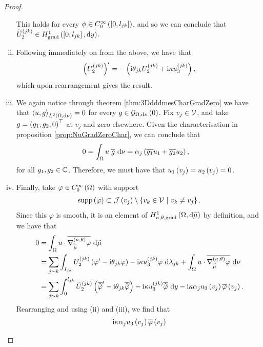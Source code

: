 \begin{proof}
\begin{enumerate}[(i)]
		This holds for every $\phi\in C^{\infty}_{0}\left( \left[ 0,l_{jk} \right] \right)$, and so we can conclude that $\widetilde{U}_2^{(jk)}\in H^1_\mathrm{grad}\left( \left[ 0,l_{jk} \right], \mathrm{d}y \right)$.
		\item Following immediately on from the above, we have that
		\begin{align*}
			\left( U_2^{(jk)} \right)' = - \left(  \mathrm{i}\theta_{jk}U_2^{(jk)} + \mathrm{i}\kappa u_3^{(jk)}  \right),
		\end{align*}
		which upon rearrangement gives the result.
		\item We again notice through theorem \ref{thm:3DdddmesCharGradZero} we have that $\left\langle u , g \right\rangle_{L^{2}\left( \Omega,\mathrm{d} \nu \right)}=0$ for every $g\in\mathcal{G}_{ \Omega, \mathrm{d}\nu}\left( 0 \right)$.
		Fix $v_j\in\mathcal{V}$, and take $g=\left( g_1,g_2,0 \right)^\top$ at $v_j$ and zero elsewhere.
		Given the characterisation in proposition \ref{prop:NuGradZeroChar}, we can conclude that
		\begin{align*}
			0 &= \int_{\Omega} u_\cdot\overline{g}  \ \mathrm{d}\nu
			= \alpha_j\left( \overline{g_1}u_1 + \overline{g_2}u_2 \right),
		\end{align*}
		for all $g_1,g_2\in\mathbb{C}$.
		Therefore, we must have that $u_1\left( v_j \right)=u_2\left( v_j \right)=0$.
		\item Finally, take $\varphi\in C^{\infty}_{0}\left( \Omega \right)$ with support
		\begin{align*}
			\mathrm{supp}\left( \varphi \right) \subset \mathcal{J}\left( v_j \right)\setminus\left\{ v_k\in\mathcal{V} \ \middle\vert \  v_k\neq v_j \right\}.
		\end{align*}
		Since this $\varphi$ is smooth, it is an element of $H^1_{\kappa,\theta,\mathrm{grad}}\left( \Omega, \mathrm{d}\widetilde{\mu} \right)$ by definition, and we have that
		\begin{align*}
		0 &= \int_{\Omega} u\cdot\overline{\nabla^{\left( \kappa, \theta \right)}_{\widetilde{\mu}}\varphi}  \ \mathrm{d}\widetilde{\mu} \\
		&= \sum_{j\sim k}\int_{I_{jk}} U_2^{(jk)}\left( \overline{\varphi}' - \mathrm{i}\theta_{jk}\overline{\varphi} \right) - \mathrm{i}\kappa u_3^{(jk)}\overline{\varphi}  \ \mathrm{d}\lambda_{jk} 
		+ \int_{\Omega} u\cdot\overline{\nabla^{\left( \kappa, \theta \right)}_{\widetilde{\mu}}\varphi}  \ \mathrm{d}\nu \\
		&= \sum_{j\sim k}\int_0^{l_{jk}} \widetilde{U}_2^{(jk)}\left( \overline{\widetilde{\varphi}}' - \mathrm{i}\theta_{jk}\overline{\widetilde{\varphi}} \right) - \mathrm{i}\kappa u_3^{(jk)}\overline{\widetilde{\varphi}} \ \mathrm{d} y
		-\mathrm{i}\kappa\alpha_j u_3\left( v_j \right)\overline{\varphi}\left( v_j \right).
		\end{align*}
		Rearranging and using (ii) and (iii), we find that
		\begin{align*}
			\rmi\wavenumber\alpha_j u_3\bracs{v_j}\overline{\varphi}\bracs{v_j}

\end{align*}
\end{enumerate}
\end{proof}
